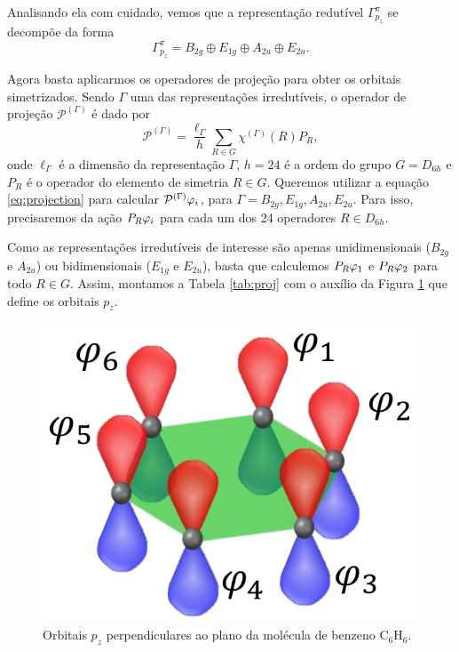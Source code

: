 \documentclass[a4paper,10pt]{article}
\begin{document}
Analisando ela com cuidado, vemos que a representação redutível $\Gamma^\pi_{p_z}$ se decompõe da forma
$$
\Gamma^\pi_{p_z} = B_{2g} \oplus E_{1g} \oplus A_{2u} \oplus E_{2u}.
$$

Agora basta aplicarmos os operadores de projeção para obter os orbitais simetrizados. Sendo $\Gamma$ uma das representações irredutíveis, o operador de projeção $\mathcal{P}^{(\Gamma)}$ é dado por
\begin{equation} \label{eq:projection}
\mathcal{P}^{(\Gamma)} = \frac{\ell_{\Gamma}}{h} \sum_{R \in G} \chi^{(\Gamma)}(R) P_R,
\end{equation}
onde $\ell_\Gamma$ é a dimensão da representação $\Gamma$, $h = 24$ é a ordem do grupo $G = D_{6h}$ e $P_R$ é o operador do elemento de simetria $R \in G$. Queremos utilizar a equação \ref{eq:projection} para calcular $\mathcal{P}^{(\Gamma)} \varphi_i$, para $\Gamma = B_{2g}, E_{1g}, A_{2u}, E_{2u}$. Para isso, precisaremos da ação $P_R \varphi_i$ para cada um dos 24 operadores $R \in D_{6h}$.

Como as representações irredutíveis de interesse são apenas unidimensionais ($B_{2g}$ e $A_{2u}$) ou bidimensionais ($E_{1g}$ e $E_{2u}$), basta que calculemos $P_R \varphi_1$ e $P_R \varphi_2$ para todo $R \in G$. Assim, montamos a Tabela \ref{tab:proj} com o auxílio da Figura \ref{fig:orbitais_pz} que define os orbitais $p_z$.
\begin{figure}[H]
\centering
\includegraphics[width=0.6\linewidth]{fig/orbitais_pz.png}
\caption{Orbitais $p_z$ perpendiculares ao plano da molécula de benzeno C$_6$H$_6$.}
\label{fig:orbitais_pz}
\end{figure}
\end{document}

